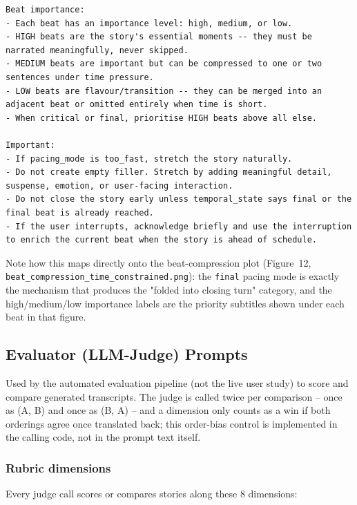 \documentclass[10pt]{article}
\begin{document}
\begin{lstlisting}
Beat importance:
- Each beat has an importance level: high, medium, or low.
- HIGH beats are the story's essential moments -- they must be narrated meaningfully, never skipped.
- MEDIUM beats are important but can be compressed to one or two sentences under time pressure.
- LOW beats are flavour/transition -- they can be merged into an adjacent beat or omitted entirely when time is short.
- When critical or final, prioritise HIGH beats above all else.

Important:
- If pacing_mode is too_fast, stretch the story naturally.
- Do not create empty filler. Stretch by adding meaningful detail, suspense, emotion, or user-facing interaction.
- Do not close the story early unless temporal_state says final or the final beat is already reached.
- If the user interrupts, acknowledge briefly and use the interruption to enrich the current beat when the story is ahead of schedule.
\end{lstlisting}

Note how this maps directly onto the beat-compression plot (Figure~12,
\texttt{beat\-\_com\-pression\-\_time\-\_constrained.png}): the
\texttt{final} pacing mode is exactly the mechanism that produces the
"folded into closing turn" category, and the high/medium/low importance
labels are the priority subtitles shown under each beat in that figure.

\subsection{Evaluator (LLM-Judge) Prompts}
\label{app:evaluator-prompts}

Used by the automated evaluation pipeline (not the live user study) to score
and compare generated transcripts. The judge is called twice per comparison
-- once as (A, B) and once as (B, A) -- and a dimension only counts as a win
if both orderings agree once translated back; this order-bias control is
implemented in the calling code, not in the prompt text itself.

\subsubsection{Rubric dimensions}

Every judge call scores or compares stories along these 8 dimensions:
\end{document}
